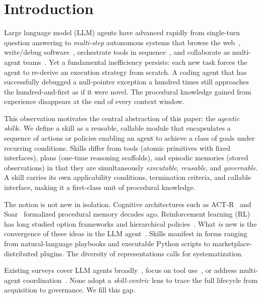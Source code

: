 \documentclass[conference, compsoc]{IEEEtran}
\theoremstyle{plain}
\begin{document}
\section{Introduction}
\label{sec:intro}

Large language model (LLM) agents have advanced rapidly from single-turn question answering to \textit{multi-step} autonomous systems that browse the web~\cite{zhou2024webarena}, write/debug software~\cite{yang2024sweagent,ji2025measuring}, orchestrate tools in sequence~\cite{shen2023hugginggpt,xie2024can}, and collaborate as multi-agent teams~\cite{hong2024metagpt,wu2024autogen}. 
Yet a fundamental inefficiency persists: each new task forces the agent to re-derive an execution strategy from scratch. A coding agent that has successfully debugged a null-pointer exception a hundred times still approaches the hundred-and-first as if it were novel. The procedural knowledge gained from experience disappears at the end of every context window.

This observation motivates the central abstraction of this paper: the \emph{agentic skill}s. We define a skill as a reusable, callable module that encapsulates a sequence of actions or policies enabling an agent to achieve a class of goals under recurring conditions. Skills differ from tools (atomic primitives with fixed interfaces), plans (one-time reasoning scaffolds), and episodic memories (stored observations) in that they are simultaneously \emph{executable}, \emph{reusable}, and \emph{governable}. A skill carries its own applicability conditions, termination criteria, and callable interface, making it a first-class unit of procedural knowledge.

The notion is not new in isolation. Cognitive architectures such as ACT-R~\cite{anderson2004actr} and Soar~\cite{laird2012soar} formalized procedural memory decades ago. Reinforcement learning (RL) has long studied option frameworks and hierarchical policies~\cite{sutton1999options}. 
What \emph{is} new is the convergence of these ideas in the LLM agent~\cite{zhanglandscape,qiantoolrl}. Skills manifest in forms ranging from natural-language playbooks and executable Python scripts to marketplace-distributed plugins. The diversity of representations calls for systematization.

Existing surveys cover LLM agents broadly~\cite{gaosurvey,ma2026safety,wang2024survey_agents,shahriar2025survey,huang2024understanding,guo2024large,yehudai2025survey}, focus on tool use~\cite{fan2026information,qin2024toollearning,schick2024toolformer}, or address multi-agent coordination~\cite{guo2024multiagent}. None adopt a \textit{skill-centric} lens to trace the full lifecycle from acquisition to governance. We fill this gap.
\end{document}
